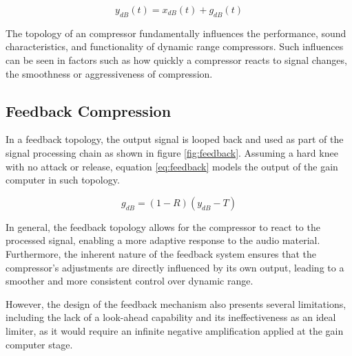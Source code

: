 \documentclass[10pt]{article}
\begin{document}
\begin{multicols*}{2}
                \begin{equation} \label{eq:gen-topology}
                    y_{dB}(t)=x_{dB}(t)+g_{dB}(t)
                \end{equation}
            
            \noindent The topology of an compressor fundamentally influences the performance, sound characteristics, and functionality of dynamic range compressors. Such influences can be seen in factors such as how quickly a compressor reacts to signal changes, the smoothness or aggressiveness of compression.

            \subsection{Feedback Compression}
                In a feedback topology, the output signal is looped back and used as part of the signal processing chain as shown in figure \ref{fig:feedback}. Assuming a hard knee with no attack or release, equation \ref{eq:feedback} models the output of the gain computer in such topology.\par

                    \begin{equation} \label{eq:feedback}
                        g_{dB}=(1-R)(y_{dB}-T)
                    \end{equation}
                
                \noindent In general, the feedback topology allows for the compressor to react to the processed signal, enabling a more adaptive response to the audio material. Furthermore, the inherent nature of the feedback system ensures that the compressor's adjustments are directly influenced by its own output, leading to a smoother and more consistent control over dynamic range.\par
                However, the design of the feedback mechanism also presents several limitations, including the lack of a look-ahead capability and its ineffectiveness as an ideal limiter, as it would require an infinite negative amplification applied at the gain computer stage.

                \vspace{2ex}

                    \noindent
                    \begin{minipage}{\linewidth}

                        \centering


\end{minipage}
\end{multicols*}
\end{document}
